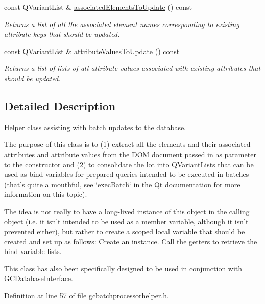 \begin{DoxyCompactItemize}
const \-Q\-Variant\-List \& \hyperlink{class_g_c_batch_processor_helper_a22c3d5f21c3dff029e89536c0a08daf4}{associated\-Elements\-To\-Update} () const 
\begin{DoxyCompactList}\small\item\em \-Returns a list of all the associated element names corresponding to existing attribute keys that should be updated. \end{DoxyCompactList}\item 
const \-Q\-Variant\-List \& \hyperlink{class_g_c_batch_processor_helper_a390cab72c76739bea0d98d5ba1ff7e21}{attribute\-Values\-To\-Update} () const 
\begin{DoxyCompactList}\small\item\em \-Returns a list of lists of all attribute values associated with existing attributes that should be updated. \end{DoxyCompactList}\end{DoxyCompactItemize}


\subsection{\-Detailed \-Description}
\-Helper class assisting with batch updates to the database. 

\-The purpose of this class is to (1) extract all the elements and their associated attributes and attribute values from the \-D\-O\-M document passed in as parameter to the constructor and (2) to consolidate the lot into \-Q\-Variant\-Lists that can be used as bind variables for prepared queries intended to be executed in batches (that's quite a mouthful, see \char`\"{}exec\-Batch\char`\"{} in the \-Qt documentation for more information on this topic).

\-The idea is not really to have a long-\/lived instance of this object in the calling object (i.\-e. it isn't intended to be used as a member variable, although it isn't prevented either), but rather to create a scoped local variable that should be created and set up as follows\-: \-Create an instance. \-Call the getters to retrieve the bind variable lists.

\-This class has also been specifically designed to be used in conjunction with \-G\-C\-Database\-Interface. 

\-Definition at line \hyperlink{gcbatchprocessorhelper_8h_source_l00057}{57} of file \hyperlink{gcbatchprocessorhelper_8h_source}{gcbatchprocessorhelper.\-h}.



